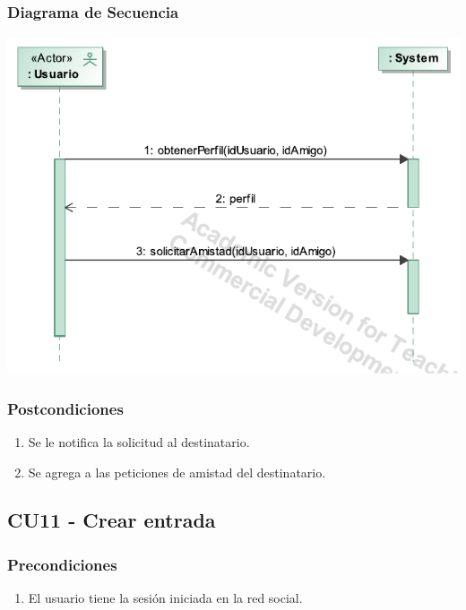 \documentclass[12pt, a4paper, titlepage]{article}
\begin{document}
\subsubsection{Diagrama de Secuencia}
\begin{center}
	\includegraphics[width=\textwidth]{Imagenes/Enviar_solicitud_amistad}
\end{center}

\subsubsection{Postcondiciones}
\begin{enumerate}
	\item Se le notifica la solicitud al destinatario.
	\item Se agrega a las peticiones de amistad del destinatario.
\end{enumerate}

\subsection{CU11 - Crear entrada}

\subsubsection{Precondiciones}
\begin{enumerate}
	\item El usuario tiene la sesión iniciada en la red social.
\end{enumerate}
\end{document}

